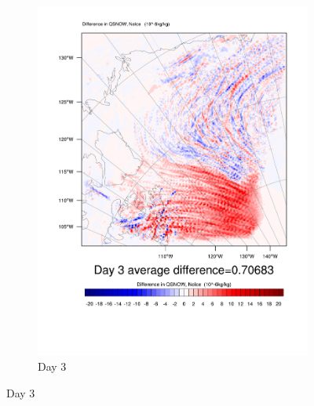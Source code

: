 \begin{figure}
\begin{subfigure}{0.32\textwidth}
		\includegraphics[width=\textwidth]{results/noice/diff_NoIce_qsnow_Day3.pdf}
		\caption{Day 3}
	\end{subfigure}


\end{figure}
